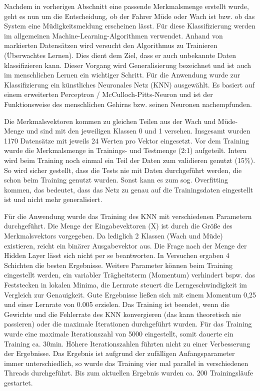 \label{sec:classification}
Nachdem in vorherigen Abschnitt eine passende Merkmalsmenge erstellt wurde, geht es nun um die Entscheidung, ob der Fahrer Müde oder Wach ist bzw. ob das System eine Müdigkeitsmeldung erscheinen lässt. Für diese Klassifizierung werden im allgemeinen Machine-Learning-Algorithmen verwendet. Anhand von markierten Datensätzen wird versucht den Algorithmus zu Trainieren (Überwachtes Lernen). Dies dient dem Ziel, dass er auch unbekannte Daten klassifizieren kann. Dieser Vorgang wird Generalisierung bezeichnet und ist auch im menschlichen Lernen ein wichtiger Schritt. Für die Anwendung wurde zur Klassifizierung ein künstliches Neuronales Netz (KNN) ausgewählt. Es basiert auf einem erweiterten Perceptron / McCulloch-Pitts-Neuron \cite{ann} und ist der Funktionsweise des menschlichen Gehirns bzw. seinen Neuronen nachempfunden\cite{marsland_opac-b1129336}. \ann

Die Merkmalsvektoren kommen zu gleichen Teilen aus der Wach und Müde-Menge und sind mit den jeweiligen Klassen 0 und 1 versehen. Insgesamt wurden 1170 Datensätze mit jeweils 24 Werten pro Vektor eingesetzt. Vor dem Training wurde die Merkmalsmenge in Trainings- und Testmenge (2:1) aufgeteilt. Intern wird beim Training noch einmal ein Teil der Daten zum validieren genutzt (15\%). So wird sicher gestellt, dass die Tests nie mit Daten durchgeführt werden, die schon beim Training genutzt wurden. Sonst kann es zum sog. Overfitting kommen, das bedeutet, dass das Netz zu genau auf die Trainingsdaten eingestellt ist und nicht mehr generalisiert.

Für die Anwendung wurde das Training des KNN mit verschiedenen Parametern durchgeführt. Die Menge der Eingabevektoren (X) ist durch die Größe des Merkmalsvektors vorgegeben. Da lediglich 2 Klassen (Wach und Müde) existieren, reicht ein binärer Ausgabevektor aus. Die Frage nach der Menge der Hidden Layer lässt sich nicht per se beantworten. In Versuchen ergaben 4 Schichten die besten Ergebnisse. Weitere Parameter können beim Training eingestellt werden, ein variabler Trägheitsterm (Momentum) verhindert bspw. das Feststecken in lokalen Minima, die Lernrate steuert die Lerngeschwindigkeit im Vergleich zur Genauigkeit. Gute Ergebnisse ließen sich mit einem Momentum 0,25 und einer Lernrate von 0.005 erzielen. Das Training ist beendet, wenn die Gewichte und die Fehlerrate des KNN konvergieren (das kann theoretisch nie passieren) oder die maximale Iterationen durchgeführt wurden. Für das Training wurde eine maximale Iterationszahl von 5000 eingestellt, somit dauerte ein Training ca. 30min. Höhere Iterationszahlen führten nicht zu einer Verbesserung der Ergebnisse. Das Ergebnis ist aufgrund der zufälligen Anfangsparameter immer unterschiedlich, so wurde das Training vier mal parallel in verschiedenen Threads durchgeführt. Bis zum aktuellen Ergebnis wurden ca. 200 Trainingsläufe gestartet.

